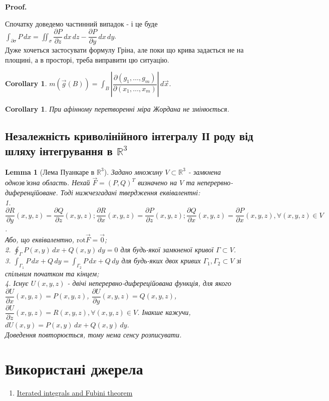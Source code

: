 \documentclass[a4paper, 10pt]{article}
\makeatletter
\def\departial#1#2{\dfrac{\partial {#1}}{\partial {#2}}}
\def\qed{$\blacksquare$}
\theoremstyle{theoremdd}
\theoremstyle{theoremdd}
\theoremstyle{theoremdd}
\theoremstyle{theoremdd}
\theoremstyle{theoremdd}
\theoremstyle{theoremdd}
\theoremstyle{theoremdd}
\newtheorem{lemma}[theorem]{Lemma}
\theoremstyle{theoremdd}
\newtheorem{corollary}[theorem]{Corollary}
\renewenvironment{proof}[1][Proof.\\]{\par
\pushQED{\hfill \qed}%
\normalfont \topsep6\p@\@plus6\p@\relax
\trivlist
\item\relax
{\bfseries
#1\@addpunct{.}}\hspace\labelsep\ignorespaces
}{%
\popQED\endtrivlist\@endpefalse
}
\makeatother
\begin{document}
\begin{proof}
Спочатку доведемо частинний випадок - і це буде $\displaystyle\int_{\partial \sigma} P\,dx = \iint_\sigma \departial{P}{z}\,dx\,dz - \departial{P}{y}\,dx\,dy$.\\
Дуже хочеться застосувати формулу Гріна, але поки що крива задається не на площині, а в просторі, треба виправити цю ситуацію.
\end{proof}

\begin{corollary}
$m(\vec{g}(B)) = \displaystyle\int_B \left| \dfrac{\partial(g_1,\dots,g_m)}{\partial(x_1,\dots,x_m)} \right|\,d\vec{x}$.
\end{corollary}

\begin{corollary}
При афінному перетворенні міра Жордана не змінюється.
\end{corollary}

\subsection{Незалежність криволінійного інтегралу ІІ роду від шляху інтегрування в $\mathbb{R}^3$}
\begin{lemma}[Лема Пуанкаре в $\mathbb{R}^3$]
Задано множину $V \subset \mathbb{R}^3$ - замкнена однозв'язна область. Нехай $\vec{F} = (P,Q)^T$ визначено на $V$ та неперервно-диференційоване. Тоді нижчезгадані твердження еквівалентні:\\
1. $\departial{R}{y}(x,y,z) = \departial{Q}{z}(x,y,z); \departial{R}{x}(x,y,z) = \departial{P}{z}(x,y,z); \departial{Q}{x}(x,y,z) = \departial{P}{x}(x,y,z), \forall (x,y,z) \in V$.\\
Або, що еквівалентно, $\text{rot} \vec{F} = \vec{0}$;\\
2. $\displaystyle\oint_{\Gamma} P(x,y)\,dx + Q(x,y)\,dy = 0$ для будь-якої замкненої кривої $\Gamma \subset V$.\\
3. $\displaystyle\int_{\Gamma_1} P\,dx + Q\,dy = \int_{\Gamma_2} P\,dx + Q\,dy$ для будь-яких двох кривих $\Gamma_1, \Gamma_2 \subset V$ зі спільним початком та кінцем;\\
4. Існує $U(x,y,z)$ - двічі неперервно-дифереційована функція, для якого $\departial{U}{x}(x,y,z) = P(x,y,z)$, $\departial{U}{y}(x,y,z) = Q(x,y,z)$, $\departial{U}{z}(x,y,z) = R(x,y,z), \forall (x,y,z) \in V$. Інакше кажучи,\\ $dU(x,y) =  P(x,y)\,dx + Q(x,y)\,dy$.\\
\textit{Доведення повторюється, тому нема сенсу розписувати.}
\end{lemma}
\newpage

\section*{Використані джерела}
\begin{enumerate}
\item \href{https://www.jirka.org/ra/html/sec_iteratedints.html#fig_fubinibad}{Iterated integrals and Fubini theorem}
\end{enumerate}
\end{document}
